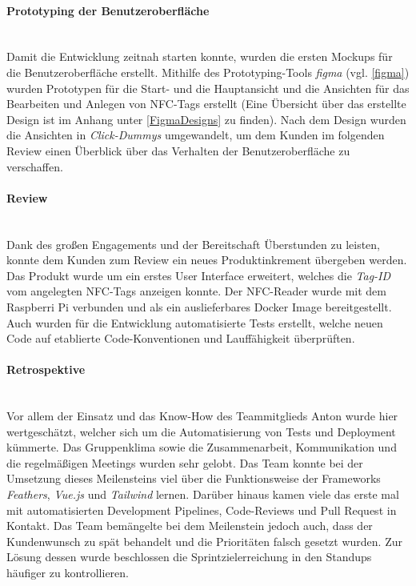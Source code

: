 \documentclass[10pt, a4paper]{article}
\begin{document}
\begin{onehalfspace}
\paragraph*{Prototyping der Benutzeroberfläche} $~$ \\
Damit die Entwicklung zeitnah starten konnte, wurden die ersten Mockups für die Benutzeroberfläche erstellt.
Mithilfe des Prototyping-Tools \textit{figma} (vgl. \autoref*{figma}) wurden Prototypen für die Start- und die Hauptansicht und die Ansichten
für das Bearbeiten und Anlegen von NFC-Tags erstellt (Eine Übersicht über das erstellte Design ist im Anhang unter \autoref*{FigmaDesigns} zu finden).
Nach dem Design wurden die Ansichten in \textit{Click-Dummys} umgewandelt, um dem Kunden im folgenden Review einen Überblick über das Verhalten der
Benutzeroberfläche zu verschaffen.

\paragraph*{Review} $~$ \\
Dank des großen Engagements und der Bereitschaft Überstunden zu leisten, konnte dem Kunden zum Review ein neues Produktinkrement übergeben werden.
Das Produkt wurde um ein erstes User Interface erweitert, welches die \textit{Tag-ID} vom angelegten NFC-Tags anzeigen konnte.
Der NFC-Reader wurde mit dem Raspberri Pi verbunden und als ein auslieferbares Docker Image bereitgestellt.
Auch wurden für die Entwicklung automatisierte Tests erstellt, welche neuen Code auf etablierte Code-Konventionen und Lauffähigkeit überprüften.

\paragraph*{Retrospektive} $~$ \\
Vor allem der Einsatz und das Know-How des Teammitglieds Anton wurde hier wertgeschätzt, welcher sich um die Automatisierung von Tests und Deployment kümmerte.
Das Gruppenklima sowie die Zusammenarbeit, Kommunikation und die regelmäßigen Meetings wurden sehr gelobt.
Das Team konnte bei der Umsetzung dieses Meilensteins viel über die Funktionsweise der Frameworks \textit{Feathers}, \textit{Vue.js} und \textit{Tailwind} lernen.
Darüber hinaus kamen viele das erste mal mit automatisierten Development Pipelines, Code-Reviews und Pull Request in Kontakt.
Das Team bemängelte bei dem Meilenstein jedoch auch, dass der Kundenwunsch zu spät behandelt und die Prioritäten falsch gesetzt wurden.
Zur Lösung dessen wurde beschlossen die Sprintzielerreichung in den Standups häufiger zu kontrollieren.


\end{onehalfspace}
\end{document}
